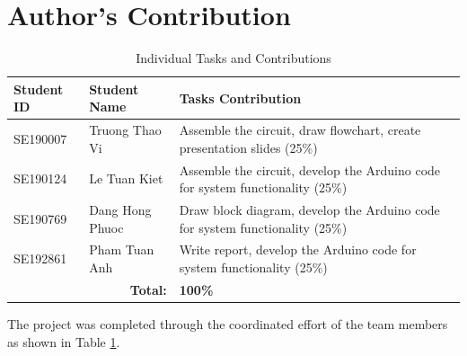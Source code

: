 \documentclass[a4paper, 10pt]{article}
\begin{document}
	\section{Author's Contribution}
	\begin{table}[htbp]
		\centering
		\caption{Individual Tasks and Contributions}
		\begin{tabularx}{\textwidth}{@{}llX@{}}
			\toprule
			\textbf{Student ID} & \textbf{Student Name} & \textbf{Tasks Contribution} \\
			\midrule
			SE190007 & Truong Thao Vi & Assemble the circuit, draw flowchart, create presentation slides (25\%) \\
			SE190124 & Le Tuan Kiet & Assemble the circuit, develop the Arduino code for system functionality (25\%) \\
			SE190769 & Dang Hong Phuoc & Draw block diagram, develop the Arduino code for system functionality (25\%) \\
			SE192861 & Pham Tuan Anh & Write report, develop the Arduino code for system functionality (25\%) \\
			\bottomrule
			\multicolumn{2}{r}{\textbf{Total:}} & \textbf{100\%} \\
		\end{tabularx}
		\label{tab:contribution}
	\end{table}
	The project was completed through the coordinated effort of the team members as shown in Table \ref{tab:contribution}.
	
	\newpage
	\printbibliography[heading=bibintoc, title={References}]
	
\end{document}
